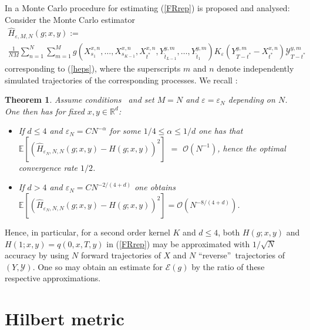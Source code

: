\documentclass[a4paper,11pt]{amsart}
\theoremstyle{plain}
\newtheorem{theorem}{Theorem}
\theoremstyle{remark}
\begin{document}
In \cite{BS2014} a Monte Carlo procedure for estimating (\ref{FRrep}) is
proposed and analysed: Consider the Monte Carlo estimator%
\begin{multline*}
\widehat{H}_{\varepsilon,M,N}(g;x,y):=\\
\frac{1}{NM}\sum_{n=1}^{N}\sum_{m=1}^{M}g\left(  X_{s_{1}}^{x,n}%
,\ldots,X_{s_{K-1}}^{x,n},X_{t^{\ast}}^{x,n},Y_{\widehat{t}_{L-1}}%
^{y,m},\ldots,Y_{\widehat{t}_{1}}^{y,m}\right)  K_{\varepsilon}(Y_{T-t^{\ast}%
}^{y,m}-X_{t^{\ast}}^{x,n})\mathcal{Y}_{T-t^{\ast}}^{y,m}%
\end{multline*}
corresponding to (\ref{heps}), where the superscripts $m$ and $n$ denote
independently simulated trajectories of the corresponding processes. We recall
\cite[Thm. 3.4]{BS2014}:

\begin{theorem}
\label{FRconv} Assume conditions~\cite[4.1, 4.4, and 4.5]{BS2014} and set
$M=N$ and $\varepsilon=\varepsilon_{N}$ depending on $N$. One then has for
fixed $x,y\in\mathbb{R}^{d}$:

\begin{itemize}
\item If $d\leq4$ and $\varepsilon_{N}=CN^{-\alpha}$ for some $1/4\leq
\alpha\leq1/d$ one has that \\ $\mathbb{E}\left[  \left(  \widehat{H}%
_{\varepsilon_{N},N,N}(g;x,y)-H(g;x,y)\right)  ^{2}\right] $ $ =$ $\mathcal{O}%
(N^{-1})$, hence the optimal convergence rate $1/2$.

\item If $d>4$ and $\varepsilon_{N}=CN^{-2/(4+d)}$ one obtains\newline%
$\mathbb{E}\left[  \left(  \widehat{H}_{\varepsilon_{N},N,N}%
(g;x,y)-H(g;x,y)\right)  ^{2}\right]  =\mathcal{O}(N^{-8/(4+d)})$.\bigskip
\end{itemize}
\end{theorem}

Hence, in particular, for a second order kernel $K$ and $d\leq4$, both
$H(g;x,y)$ and $H(1;x,y)=q(0,x,T,y)$ in (\ref{FRrep}) may be approximated with
$1/\sqrt{N}$ accuracy by using $N$ forward trajectories of $X$ and $N$
\textquotedblleft reverse\textquotedblright\ trajectories of $(Y,\mathcal{Y}%
)$. One so may obtain an estimate for $\mathcal{E}(g)$ by the ratio of these
respective approximations.

\section{Hilbert metric}\label{recapHM}
\end{document}
